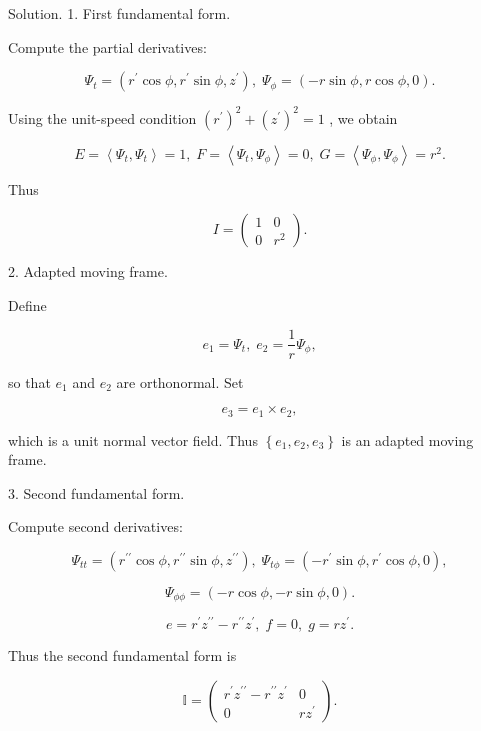 \documentclass[10pt]{article}
\begin{document}
Solution. 1. First fundamental form.

Compute the partial derivatives:

\[
{\Psi }_{t} = \left( {{r}^{\prime }\cos \phi ,{r}^{\prime }\sin \phi ,{z}^{\prime }}\right) ,\;{\Psi }_{\phi } = \left( {-r\sin \phi ,r\cos \phi ,0}\right) .
\]

Using the unit-speed condition \({\left( {r}^{\prime }\right) }^{2} + {\left( {z}^{\prime }\right) }^{2} = 1\) , we obtain

\[
E = \left\langle  {{\Psi }_{t},{\Psi }_{t}}\right\rangle   = 1,\;F = \left\langle  {{\Psi }_{t},{\Psi }_{\phi }}\right\rangle   = 0,\;G = \left\langle  {{\Psi }_{\phi },{\Psi }_{\phi }}\right\rangle   = {r}^{2}.
\]

Thus

\[
I = \left( \begin{matrix} 1 & 0 \\  0 & {r}^{2} \end{matrix}\right) .
\]

2. Adapted moving frame.

Define

\[
{e}_{1} = {\Psi }_{t},\;{e}_{2} = \frac{1}{r}{\Psi }_{\phi },
\]

so that \({e}_{1}\) and \({e}_{2}\) are orthonormal. Set

\[
{e}_{3} = {e}_{1} \times  {e}_{2},
\]

which is a unit normal vector field. Thus \(\left\{  {{e}_{1},{e}_{2},{e}_{3}}\right\}\) is an adapted moving frame.

3. Second fundamental form.

Compute second derivatives:

\[
{\Psi }_{tt} = \left( {{r}^{\prime \prime }\cos \phi ,{r}^{\prime \prime }\sin \phi ,{z}^{\prime \prime }}\right) ,\;{\Psi }_{t\phi } = \left( {-{r}^{\prime }\sin \phi ,{r}^{\prime }\cos \phi ,0}\right) ,
\]

\[
{\Psi }_{\phi \phi } = \left( {-r\cos \phi , - r\sin \phi ,0}\right) .
\]

\[
e = {r}^{\prime }{z}^{\prime \prime } - {r}^{\prime \prime }{z}^{\prime },\;f = 0,\;g = r{z}^{\prime }.
\]

Thus the second fundamental form is

\[
\mathbb{I} = \left( \begin{matrix} {r}^{\prime }{z}^{\prime \prime } - {r}^{\prime \prime }{z}^{\prime } & 0 \\  0 & r{z}^{\prime } \end{matrix}\right) .
\]
\end{document}
